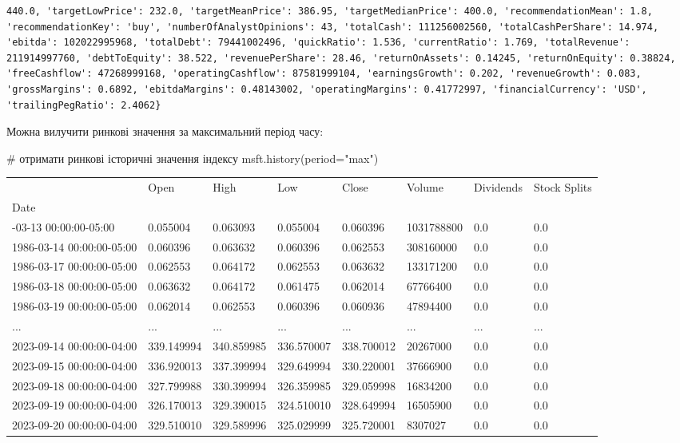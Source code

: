 \documentclass[
  letterpaper,
]{report}
\newenvironment{Shaded}{\begin{snugshade}}{\end{snugshade}}
\newcommand{\CommentTok}[1]{\textcolor[rgb]{0.37,0.37,0.37}{#1}}
\newcommand{\NormalTok}[1]{\textcolor[rgb]{0.00,0.23,0.31}{#1}}
\newcommand{\OperatorTok}[1]{\textcolor[rgb]{0.37,0.37,0.37}{#1}}
\newcommand{\StringTok}[1]{\textcolor[rgb]{0.13,0.47,0.30}{#1}}
\begin{document}
\begin{verbatim}
440.0, 'targetLowPrice': 232.0, 'targetMeanPrice': 386.95, 'targetMedianPrice': 400.0, 'recommendationMean': 1.8, 'recommendationKey': 'buy', 'numberOfAnalystOpinions': 43, 'totalCash': 111256002560, 'totalCashPerShare': 14.974, 'ebitda': 102022995968, 'totalDebt': 79441002496, 'quickRatio': 1.536, 'currentRatio': 1.769, 'totalRevenue': 211914997760, 'debtToEquity': 38.522, 'revenuePerShare': 28.46, 'returnOnAssets': 0.14245, 'returnOnEquity': 0.38824, 'freeCashflow': 47268999168, 'operatingCashflow': 87581999104, 'earningsGrowth': 0.202, 'revenueGrowth': 0.083, 'grossMargins': 0.6892, 'ebitdaMargins': 0.48143002, 'operatingMargins': 0.41772997, 'financialCurrency': 'USD', 'trailingPegRatio': 2.4062}
\end{verbatim}

Можна вилучити ринкові значення за максимальний період часу:

\begin{Shaded}
\begin{Highlighting}[]
\CommentTok{\# отримати ринкові історичні значення індексу}
\NormalTok{msft.history(period}\OperatorTok{=}\StringTok{"max"}\NormalTok{)}
\end{Highlighting}
\end{Shaded}

\begin{longtable}[]{@{}llllllll@{}}
\toprule\noalign{}
& Open & High & Low & Close & Volume & Dividends & Stock Splits \\
Date & & & & & & & \\
\midrule\noalign{}
\endhead
\bottomrule\noalign{}
\endlastfoot
1986-03-13 00:00:00-05:00 & 0.055004 & 0.063093 & 0.055004 & 0.060396 &
1031788800 & 0.0 & 0.0 \\
1986-03-14 00:00:00-05:00 & 0.060396 & 0.063632 & 0.060396 & 0.062553 &
308160000 & 0.0 & 0.0 \\
1986-03-17 00:00:00-05:00 & 0.062553 & 0.064172 & 0.062553 & 0.063632 &
133171200 & 0.0 & 0.0 \\
1986-03-18 00:00:00-05:00 & 0.063632 & 0.064172 & 0.061475 & 0.062014 &
67766400 & 0.0 & 0.0 \\
1986-03-19 00:00:00-05:00 & 0.062014 & 0.062553 & 0.060396 & 0.060936 &
47894400 & 0.0 & 0.0 \\
... & ... & ... & ... & ... & ... & ... & ... \\
2023-09-14 00:00:00-04:00 & 339.149994 & 340.859985 & 336.570007 &
338.700012 & 20267000 & 0.0 & 0.0 \\
2023-09-15 00:00:00-04:00 & 336.920013 & 337.399994 & 329.649994 &
330.220001 & 37666900 & 0.0 & 0.0 \\
2023-09-18 00:00:00-04:00 & 327.799988 & 330.399994 & 326.359985 &
329.059998 & 16834200 & 0.0 & 0.0 \\
2023-09-19 00:00:00-04:00 & 326.170013 & 329.390015 & 324.510010 &
328.649994 & 16505900 & 0.0 & 0.0 \\
2023-09-20 00:00:00-04:00 & 329.510010 & 329.589996 & 325.029999 &
325.720001 & 8307027 & 0.0 & 0.0 \\
\end{longtable}
\end{document}
